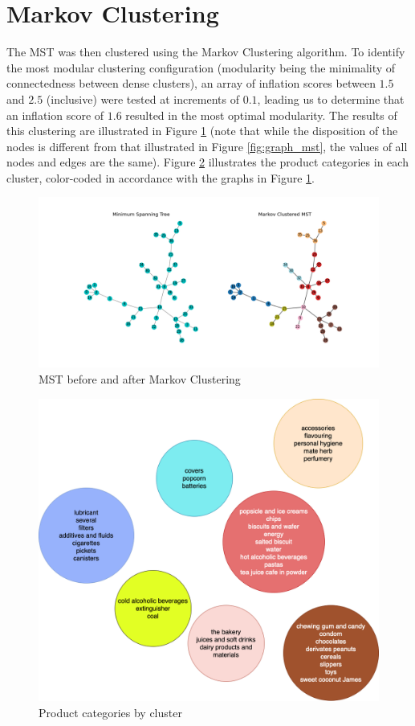 \documentclass[paper=a4,fontsize=11pt]{report}	%
\begin{document}
\section{Markov Clustering}
The MST was then clustered using the Markov Clustering algorithm. To identify the most modular clustering configuration (modularity being the minimality of connectedness between dense clusters), an array of inflation scores between $1.5$ and $2.5$ (inclusive) were tested at increments of $0.1$, leading us to determine that an inflation score of $1.6$ resulted in the most optimal modularity. The results of this clustering are illustrated in Figure \ref{fig:clustered} (note that while the disposition of the nodes is different from that illustrated in Figure \ref{fig:graph_mst}, the values of all nodes and edges are the same). Figure \ref{fig:cluster_named} illustrates the product categories in each cluster, color-coded in accordance with the graphs in Figure \ref{fig:clustered}.

\begin{figure}[H]
\centering
\includegraphics[scale=0.31]{mst_clustered_no_fuel}
\caption{MST before and after Markov Clustering}
\label{fig:clustered}
\end{figure}

\begin{figure}[H]
\centering
\includegraphics[scale=0.31]{cluster_named}
\caption{Product categories by cluster}
\label{fig:cluster_named}
\end{figure}
\end{document}
